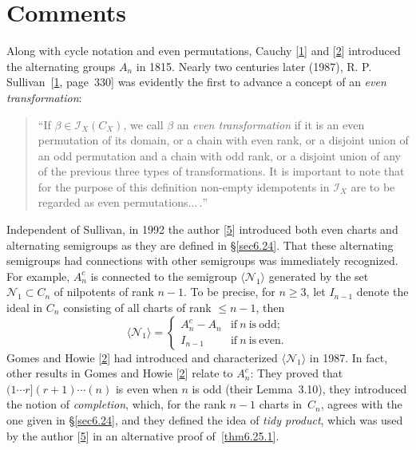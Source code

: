 \documentclass{surv-l}
\numberwithin{equation}{section}
\numberwithin{table}{section}
\numberwithin{figure}{section}
\theoremstyle{definition}
\begin{document}
\section{Comments}\label{sec6.27}

Along with cycle notation and even permutations,
Cauchy [\hyperlink{bib7}{1}] and
[\hyperlink{bib7a}{2}] introduced the alternating groups
$A_{n}$ in 1815. Nearly two centuries later (1987), R. P.
Sullivan~[\hyperlink{bib72}{1},
page~330] was evidently the first to advance a concept of an
\emph{even transformation}:
\begin{quote}
\quad ``If $\beta\in \mathcal{I}_{X}(C_{X})$, we call $\beta$ an
\emph{even transformation} if it is an
even permutation of its domain, or a chain with even rank, or a
disjoint union of an odd permutation and a chain with odd rank, or
a disjoint union of any of the previous three types of
transformations. It is important to note that for the purpose of
this definition non-empty idempotents in $\mathcal{I}_{X}$ are to
be regarded as even permutations$\ldots\,.$''
\end{quote}

Independent of Sullivan, in 1992 the author
[\hyperlink{bib43d}{5}] introduced both even charts and
alternating semigroups as they are defined in \S\ref{sec6.24}.
That these alternating semigroups had connections with other
semigroups was immediately recognized. For example, $A_{n}^{c}$ is
connected to the semigroup $\langle\mathcal{N}_{1}\rangle$
generated by the set $\mathcal{N}_{1}\subset C_{n}$ of nilpotents
of rank $n-1$. To be precise, for $n \geq 3$, let $I_{n-1}$ denote
the ideal in $C_{n}$ consisting of all charts of rank $\leq n -1$,
then
\[
\langle \mathcal{N}_{1}\rangle=\begin{cases}
A_{n}^{c}-A_{n} & \mathrm{if}\ n\ \mathrm{is\ odd};\\
I_{n-1} &\mathrm{if}\ n\ \mathrm{is\ even}.
\end{cases}
\]
Gomes and Howie
[\hyperlink{bib22a}{2}] had introduced and characterized
$\langle \mathcal{N}_{1}\rangle$ in 1987. In fact, other results
in Gomes and Howie
[\hyperlink{bib22a}{2}] relate to $A_{n}^{c}$: They
proved that $(1\cdots r](r+1)\cdots(n)$ is even when $n$ is odd
(their Lemma~3.10), they introduced the notion of
\emph{completion}, which, for the
rank $n-1$ charts in~$C_{n}$, agrees with the one given in
\S\ref{sec6.24}, and they defined the idea of \emph{tidy
product}, which was used by the author
[\hyperlink{bib43d}{5}] in an alternative proof
of~\ref{thm6.25.1}.
\end{document}
